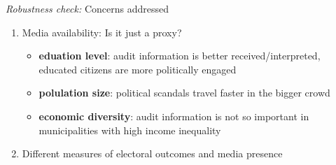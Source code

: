     \begin{frame}{\textit{Robustness check:} Concerns addressed}

        \begin{enumerate}
            \item<1-> Media availability: Is it just a proxy?
            \begin{itemize}
                \item<2-> \textbf{\color{orange}eduation level}: audit information is better received/interpreted, educated citizens are more politically engaged
                \item<3-> \textbf{\color{orange}polulation size}: political scandals travel faster in the bigger crowd
                \item<4-> \textbf{\color{orange}economic diversity}: audit information is not so important in municipalities with high income inequality
            \end{itemize}


            \item<6-> Different measures of electoral outcomes and media presence
        \end{enumerate}
    
    \end{frame}
    
